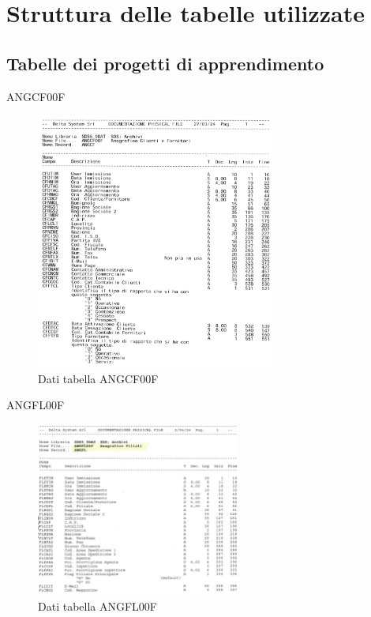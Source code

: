 \documentclass[target=bach,aauheader=,style=]{thud}
\begin{document}
\chapter{Struttura delle tabelle utilizzate}
\section{Tabelle dei progetti di apprendimento}
ANGCF00F

\begin{figure}[H]
    \begin{center}
        \includegraphics[width=0.7\textwidth, angle=90]{database/angcf00f.jpg}
    \end{center}
    \caption{Dati tabella ANGCF00F}
\end{figure}

\newpage
ANGFL00F

\begin{figure}[H]
    \begin{center}
        \includegraphics[width=0.6\textwidth]{database/angfl00f.jpg}
    \end{center}
    \caption{Dati tabella ANGFL00F}
\end{figure}
\end{document}

